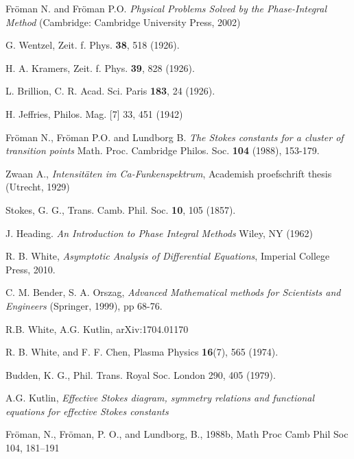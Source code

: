 \documentclass[aip,jmp,reprint]{revtex4-1}
\begin{document}
\begin{thebibliography}{30}

 Fr\"oman N. and Fr\"oman P.O. \textit{Physical Problems Solved by the Phase-Integral Method} (Cambridge: Cambridge University Press, 2002)

 G. Wentzel, Zeit. f. Phys. \textbf{38}, 518 (1926).

 H. A. Kramers, Zeit. f. Phys. \textbf{39}, 828 (1926).

 L. Brillion, C. R. Acad. Sci. Paris \textbf{183}, 24 (1926).

 H. Jeffries, Philos. Mag. [7] 33, 451 (1942)

 Fr\"oman N., Fr\"oman P.O. and Lundborg B. \textit{The Stokes constants for a cluster of transition
points} Math. Proc. Cambridge Philos. Soc. \textbf{104} (1988), 153-179.

 Zwaan A., \textit{Intensit\"aten im Ca-Funkenspektrum}, Academish proefschrift thesis (Utrecht, 1929)

 Stokes, G. G., Trans. Camb. Phil. Soc. \textbf{10}, 105 (1857).

 J. Heading. {\it An Introduction to Phase Integral Methods} 
Wiley, NY (1962)

 R. B. White, {\it Asymptotic Analysis of Differential Equations}, Imperial College Press, 2010.

 C. M. Bender, S. A. Orszag, \textit{Advanced Mathematical methods for
Scientists and Engineers} (Springer, 1999), pp 68-76.

 R.B. White, A.G. Kutlin, arXiv:1704.01170

 R. B. White, and F. F. Chen, {Plasma Physics} \textbf{16}(7), 565 (1974).

 Budden, K. G., Phil. Trans. Royal Soc. London 290, 405 (1979).

  A.G. Kutlin, \textit{Effective Stokes diagram, symmetry relations and functional equations for effective Stokes constants}

 Fr\"oman, N., Fr\"oman, P. O., and Lundborg, B., 1988b, Math Proc Camb Phil Soc 104, 181–191

\end{thebibliography}
\end{document}
